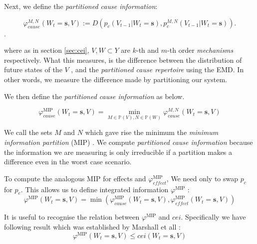 Next, we define the \textit{partitioned cause information}:

\begin{equation}
\label{def:phi2}
\varphi_{cause}^{M,N}(W_t=\mathbf{s}, V) := D \left( p_c(V_{t-1}|W_t=\mathbf{s}) ,p^{M,N}_c(V_{t-1}|W_{t} = \mathbf{s})  \right).
\end{equation}.

where as in section \ref{sec:cei}, $V, W \subset Y$ are $k$-th and $m$-th order \textit{mechanisms} respectively. What this measures, is the difference between the distribution of future states of the $V$ , and the \textit{partitioned cause repertoire} using the EMD. In other words, we measure the difference made by partitioning our system.

We then define the \textit{partitioned cause information} as below.

\begin{equation}
\label{def:phi3}
\varphi_{cause}^{\text{MIP}}(W_t=\mathbf{s}, V)  =\min \limits_{M \in \mathbb{P}(V), N \in \mathbb{P}(W)} \varphi_{cause}^{M,N}(W_t=\mathbf{s}, V) 
\end{equation}

We call the sets $M$ and $N$ which gave rise the minimum the \textit{minimum information partition} (MIP) \cite{oizumi2014phenomenology}. We compute \textit{partitioned cause information} because the information we are measuring is only irreducible if a partition makes a difference even in the worst case scenario.


To compute the analogous MIP for effects and $\varphi^{\text{MIP}}_{effect}$, We need only to swap $p_c$ for $p_e$. This allows us to define integrated information $\varphi^{\text{MIP}}$ \cite{oizumi2014phenomenology}:
\begin{equation}
\label{def:phi}
\varphi^{\text{MIP}}(W_t=\mathbf{s}, V) = \min \left( \varphi_{cause}^{\text{MIP}}(W_t=\mathbf{s}, V), \varphi_{effect}^{\text{MIP}}(W_t=\mathbf{s}, V)  \right) 
\end{equation}



It is useful to recognise the relation between $\varphi^{\text{MIP}}$ and $cei$. Specifically we have following result which was established by Marshall et all \cite{marshall2016integrated}:
\begin{equation}
\label{eq:bound_phi_cei}
\varphi^{\text{MIP}}(W_t=\mathbf{s}, V) \leq cei(W_t=\mathbf{s},V) 
\end{equation}

